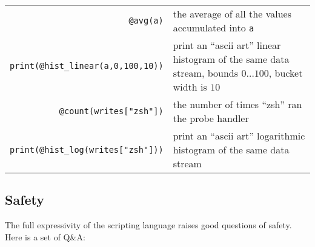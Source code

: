 \documentclass{article}
\begin{document}
\begin{tabular}{rp{}}
\verb+@avg(a)+ & the average of all the values accumulated
                        into \verb+a+ \\
\verb+print(@hist_linear(a,0,100,10))+ & print an ``ascii art'' linear
                  histogram of the same data stream,
     bounds $0 \ldots 100$, bucket width is $10$ \\
\verb|@count(writes["zsh"])| & the number of times ``zsh''
                ran the probe handler \\
\verb+print(@hist_log(writes["zsh"]))+ & print an ``ascii art'' logarithmic
                  histogram of the same data stream \\
\end{tabular}

\subsection{Safety}
\label{sec:safety}

The full expressivity of the scripting language raises good questions
of safety.  Here is a set of Q\&A:
\end{document}
